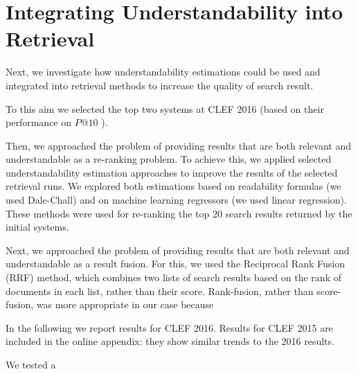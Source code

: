 \section{Integrating Understandability into Retrieval}
\label{sec:experiments}

Next, we investigate how understandability estimations could be used and integrated into retrieval methods to increase the quality of search result. 

To this aim we selected the top two systems at CLEF 2016 (based on their performance on $P@10$ ). 

Then, we approached the problem of providing results that are both relevant and understandable as a re-ranking problem. To achieve this, we applied selected understandability estimation approaches to improve the results of the selected retrieval runs. We explored both estimations based on readability formulas (we used Dale-Chall) and on machine learning regressors (we used linear regression). These methods were used for re-ranking the top 20 search results returned by the initial systems. 

Next, we approached the problem of providing results that are both relevant and understandable as a result fusion. For this, we used the Reciprocal Rank Fusion (RRF) method, which combines two lists of search results based on the rank of documents in each list, rather than their score. Rank-fusion, rather than score-fusion, was more appropriate in our case because 

In the following we report results for CLEF 2016. Results for CLEF 2015 are included in the online appendix: they show similar trends to the 2016 results.

We tested a

